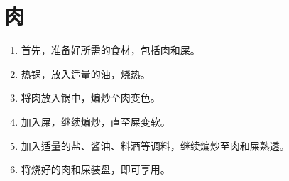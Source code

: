 \documentclass[titlepage,oneside]{ctexbook}
\begin{document}
\chapter{肉}
\begin{enumerate}
    \item 首先，准备好所需的食材，包括肉和屎。
    \item 热锅，放入适量的油，烧热。
    \item 将肉放入锅中，煸炒至肉变色。
    \item 加入屎，继续煸炒，直至屎变软。
    \item 加入适量的盐、酱油、料酒等调料，继续煸炒至肉和屎熟透。
    \item 将烧好的肉和屎装盘，即可享用。
\end{enumerate}
\end{document}
